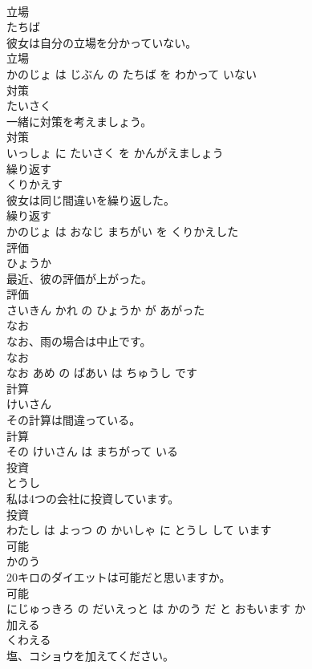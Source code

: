 \documentclass[8pt]{extreport}
\begin{document}
\begin{CJK}{UTF8}{min}
\\	立場	
\\	たちば			
\\	彼女は自分の立場を分かっていない。	
\\	立場 
\\	かのじょ は じぶん の たちば を わかって いない			
\\	対策	
\\	たいさく			
\\	一緒に対策を考えましょう。	
\\	対策 
\\	いっしょ に たいさく を かんがえましょう			
\\	繰り返す	
\\	くりかえす			
\\	彼女は同じ間違いを繰り返した。	
\\	繰り返す 
\\	かのじょ は おなじ まちがい を くりかえした			
\\	評価	
\\	ひょうか			
\\	最近、彼の評価が上がった。	
\\	評価 
\\	さいきん かれ の ひょうか が あがった			
\\	なお	
\\	なお、雨の場合は中止です。	
\\	なお 
\\	なお あめ の ばあい は ちゅうし です			
\\	計算	
\\	けいさん			
\\	その計算は間違っている。	
\\	計算 
\\	その けいさん は まちがって いる			
\\	投資	
\\	とうし			
\\	私は4つの会社に投資しています。	
\\	投資 
\\	わたし は よっつ の かいしゃ に とうし して います			
\\	可能	
\\	かのう			
\\	20キロのダイエットは可能だと思いますか。	
\\	可能 
\\	にじゅっきろ の だいえっと は かのう だ と おもいます か			
\\	加える	
\\	くわえる			
\\	塩、コショウを加えてください。	

\end{CJK}
\end{document}
